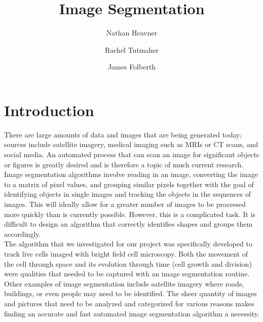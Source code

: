 \documentclass[12pt]{article}%
\date{}
\title{Image Segmentation}
\author{
 Nathan Heavner
      \and
  Rachel Tutmaher
  	\and
	James Folberth
}
\begin{document}
\maketitle

\section{Introduction}
There are large amounts of data and images that are being generated today; sources include satellite imagery, medical imaging such as MRIs or CT scans, and social media. An automated process that can scan an image for significant objects or figures is greatly desired and is therefore a topic of much current research. Image segmentation algorithms involve reading in an image, converting the image to a matrix of pixel values, and grouping similar pixels together with the goal of identifying objects in single images and tracking the objects in the sequences of images.  This will ideally allow for a greater number of images to be processed more quickly than is currently possible. However, this is a complicated task.  It is difficult to design an algorithm that correctly identifies shapes and groups them accordingly. 
\vspace{5mm} \\
The algorithm that we investigated for our project was specifically developed to track live cells imaged with bright field cell microscopy.  Both the movement of the cell through space and its evolution through time (cell growth and division) were qualities that needed to be captured with an image segmentation routine.  Other examples of image segmentation include satellite imagery where roads, buildings, or even people may need to be identified.  The sheer quantity of images and pictures that need to be analyzed and categorized for various reasons makes finding an accurate and fast automated image segmentation algorithm a necessity.
\vspace{5mm} \\
\end{document}
